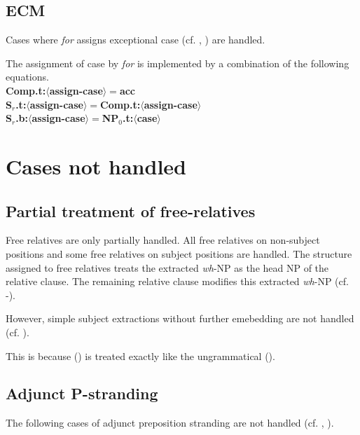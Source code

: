 \subsection{ECM}
Cases where {\em for} assigns exceptional case (cf. , ) are handled.


The assignment of case by {\em for} is implemented by a combination of the
following equations.\\
{\bf Comp.t:$\langle$assign-case$\rangle =$acc}\\
{\bf S$_{r}$.t:$\langle$assign-case$\rangle =$Comp.t:$\langle$assign-case$\rangle$}\\
{\bf S$_{r}$.b:$\langle$assign-case$\rangle =$NP$_{0}$.t:$\langle$case$\rangle$}

\section{Cases not handled}
\subsection{Partial treatment of free-relatives}
Free relatives are only partially handled. All free relatives on non-subject
positions and some free relatives on subject positions 
are handled. The structure assigned 
to free relatives treats the extracted {\em wh}-NP as the head NP of
the relative clause. The remaining relative clause modifies this
extracted {\em wh}-NP (cf. -).


However, simple subject extractions without further emebedding are not
handled (cf. ).

This is because () is treated exactly like the ungrammatical ().


\subsection{Adjunct P-stranding}
The following cases of adjunct preposition stranding are not handled 
(cf. , ).

